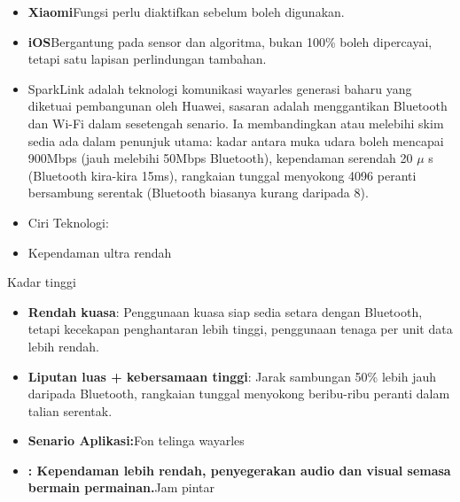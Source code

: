 
\begin{itemize}
  \item \textbf{Xiaomi}Fungsi perlu diaktifkan sebelum boleh digunakan.
  \item \textbf{iOS}Bergantung pada sensor dan algoritma, bukan 100\% boleh dipercayai, tetapi satu lapisan perlindungan tambahan.
\end{itemize}


\begin{itemize}
  \item SparkLink adalah teknologi komunikasi wayarles generasi baharu yang diketuai pembangunan oleh Huawei, sasaran adalah menggantikan Bluetooth dan Wi-Fi dalam sesetengah senario. Ia membandingkan atau melebihi skim sedia ada dalam penunjuk utama: kadar antara muka udara boleh mencapai 900Mbps (jauh melebihi 50Mbps Bluetooth), kependaman serendah 20 $\mu$ s (Bluetooth kira-kira 15ms), rangkaian tunggal menyokong 4096 peranti bersambung serentak (Bluetooth biasanya kurang daripada 8).
  \item Ciri Teknologi:
  \item Kependaman ultra rendah
\end{itemize}


Kadar tinggi


\begin{itemize}
  \item \textbf{Rendah kuasa}: Penggunaan kuasa siap sedia setara dengan Bluetooth, tetapi kecekapan penghantaran lebih tinggi, penggunaan tenaga per unit data lebih rendah.
  \item \textbf{Liputan luas + kebersamaan tinggi}: Jarak sambungan 50\% lebih jauh daripada Bluetooth, rangkaian tunggal menyokong beribu-ribu peranti dalam talian serentak.
  \item \textbf{Senario Aplikasi:}Fon telinga wayarles
  \item \textbf{: Kependaman lebih rendah, penyegerakan audio dan visual semasa bermain permainan.}Jam pintar
\end{itemize}


